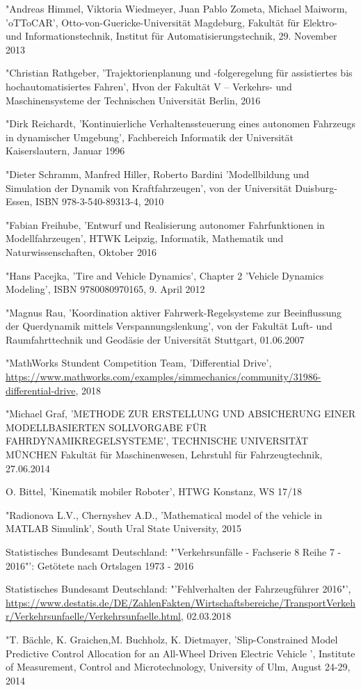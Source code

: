 \documentclass[a4paper,12pt]{scrreprt}
\begin{document}
\begin{thebibliography}{9}
\bibitem[1] "Andreas Himmel, Viktoria Wiedmeyer, Juan Pablo Zometa, Michael Maiworm, 'oTToCAR', Otto-von-Guericke-Universität Magdeburg, Fakultät für Elektro- und Informationstechnik, Institut für Automatisierungstechnik, 29. November 2013

\bibitem[2] "Christian Rathgeber, 'Trajektorienplanung und -folgeregelung für assistiertes bis hochautomatisiertes Fahren', Hvon der Fakultät V – Verkehrs- und Maschinensysteme der Technischen Universität Berlin, 2016

\bibitem[3] "Dirk Reichardt, 'Kontinuierliche Verhaltenssteuerung eines autonomen Fahrzeugs in dynamischer Umgebung', Fachbereich Informatik der Universität Kaiserslautern, Januar 1996

\bibitem[4] "Dieter Schramm, Manfred Hiller, Roberto Bardini 'Modellbildung und Simulation der Dynamik von Kraftfahrzeugen', von der Universität Duisburg-Essen, ISBN 978-3-540-89313-4, 2010

\bibitem[5] "Fabian Freihube, 'Entwurf und Realisierung autonomer Fahrfunktionen in Modellfahrzeugen', HTWK Leipzig, Informatik, Mathematik und Naturwissenschaften, Oktober 2016

\bibitem[6] "Hans Pacejka, 'Tire and Vehicle Dynamics', Chapter 2 'Vehicle Dynamics Modeling', ISBN 9780080970165, 9. April 2012

\bibitem[7] "Magnus Rau, 'Koordination aktiver Fahrwerk-Regelsysteme zur Beeinflussung der Querdynamik mittels Verspannungslenkung', von der Fakultät Luft- und Raumfahrttechnik und Geodäsie der Universität Stuttgart, 01.06.2007

"MathWorks Stundent Competition Team, 'Differential Drive', \url{https://www.mathworks.com/examples/simmechanics/community/31986-differential-drive}, 2018

\bibitem[9] "Michael Graf, 'METHODE ZUR ERSTELLUNG UND ABSICHERUNG EINER MODELLBASIERTEN SOLLVORGABE FÜR FAHRDYNAMIKREGELSYSTEME', TECHNISCHE UNIVERSITÄT MÜNCHEN Fakultät für Maschinenwesen, Lehrstuhl für Fahrzeugtechnik, 27.06.2014

 O. Bittel, 'Kinematik mobiler Roboter', HTWG Konstanz, WS 17/18

\bibitem[11] "Radionova L.V., Chernyshev A.D., 'Mathematical model of the vehicle in MATLAB Simulink', South Ural State University, 2015

Statistisches Bundesamt Deutschland: "'Verkehrsunfälle - Fachserie 8 Reihe 7 - 2016"': Getötete nach Ortslagen 1973 - 2016

Statistisches Bundesamt Deutschland: "'Fehlverhalten der Fahrzeugführer 2016"', \url{https://www.destatis.de/DE/ZahlenFakten/Wirtschaftsbereiche/TransportVerkehr/Verkehrsunfaelle/Verkehrsunfaelle.html}, 02.03.2018
   
\bibitem[14] "T. Bächle, K. Graichen,M. Buchholz, K. Dietmayer, 'Slip-Constrained Model Predictive Control Allocation for an All-Wheel Driven Electric Vehicle
', Institute of Measurement, Control and Microtechnology, University of Ulm, August 24-29, 2014

\end{thebibliography} 
\end{document}
